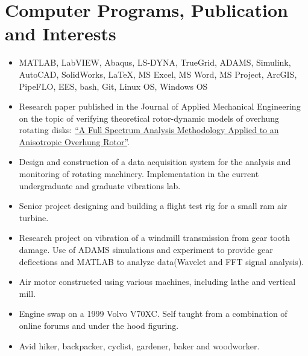\documentclass[10pt]{article} %
\newcommand{\bullspace}{.1em}
\begin{document}
\section{ Computer Programs, Publication and Interests}
\begin{adjustwidth}{-7pt}{7pt}
\begin{itemize}
	\setlength\itemsep{\bullspace}
	\item \footnotesize{MATLAB, LabVIEW, Abaqus, LS-DYNA, TrueGrid, ADAMS, Simulink, AutoCAD, SolidWorks, {\fb \LaTeX}\setmainfont[SmallCapsFont=Fontin SmallCaps]{Fontin-Regular}, MS Excel, MS Word, MS Project, ArcGIS, PipeFLO, EES, bash, Git, Linux OS, Windows OS}
	\item \footnotesize{Research paper published in the Journal of Applied Mechanical Engineering on the topic of verifying theoretical rotor-dynamic models of overhung rotating disks: \href{https://www.omicsgroup.org/journals/a-full-spectrum-analysis-methodology-applied-to-an-anisotropic-overhung-rotor-2168-9873-1000232.php?aid=81544}{``A Full Spectrum Analysis Methodology Applied to an Anisotropic Overhung Rotor''}}.
	\item \footnotesize{Design and construction of a data acquisition system for the analysis and  monitoring of rotating machinery. Implementation in the current undergraduate and graduate vibrations lab. }
	\item \footnotesize{Senior project designing and building a flight test rig for a small ram air turbine.}
	\item \footnotesize{Research project on vibration of a windmill transmission from gear tooth damage. Use of ADAMS simulations and experiment to provide gear deflections and MATLAB to analyze data(Wavelet and FFT signal analysis).}
	\item \footnotesize{Air motor constructed using various machines, including lathe and vertical mill.}
	\item \footnotesize{Engine swap on a 1999 Volvo V70XC. Self taught from a combination of online forums and under the hood figuring. }
	\item\footnotesize{Avid hiker, backpacker, cyclist, gardener, baker and woodworker.}

\end{itemize}
\end{adjustwidth}
\end{document}
